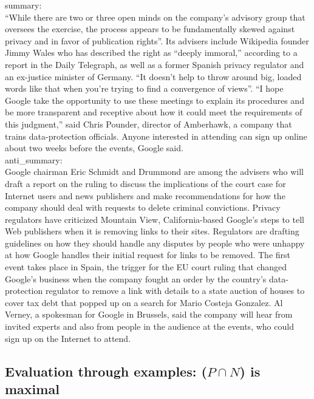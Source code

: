 \documentclass[a4paper]{report}
\begin{document}
\begin{mdframed}[style=MyFrame]

summary: \\
``While there are two or three open minds on the company's advisory group that oversees the exercise, the process appears to be fundamentally skewed against privacy and in favor of publication rights''. Its advisers include Wikipedia founder Jimmy Wales who has described the right as ``deeply immoral,'' according to a report in the Daily Telegraph, as well as a former Spanish privacy regulator and an ex-justice minister of Germany. ``It doesn't help to throw around big, loaded words like that when you're trying to find a convergence of views''. ``I hope Google take the opportunity to use these meetings to explain its procedures and be more transparent and receptive about how it could meet the requirements of this judgment,'' said Chris Pounder, director of Amberhawk, a company that trains data-protection officials. Anyone interested in attending can sign up online about two weeks before the events, Google said.\\
anti\_summary: \\
 Google chairman Eric Schmidt and Drummond are among the advisers who will draft a report on the ruling to discuss the implications of the court case for Internet users and news publishers and make recommendations for how the company should deal with requests to delete criminal convictions. Privacy regulators have criticized Mountain View, California-based Google's steps to tell Web publishers when it is removing links to their sites. Regulators are drafting guidelines on how they should handle any disputes by people who were unhappy at how Google handles their initial request for links to be removed. The first event takes place in Spain, the trigger for the EU court ruling that changed Google's business when the company fought an order by the country's data-protection regulator to remove a link with details to a state auction of houses to cover tax debt that popped up on a search for Mario Costeja Gonzalez. Al Verney, a spokesman for Google in Brussels, said the company will hear from invited experts and also from people in the audience at the events, who could sign up on the Internet to attend. 
\end{mdframed}

\subsection{Evaluation through examples: ($P\cap N$) is maximal}
\end{document}

